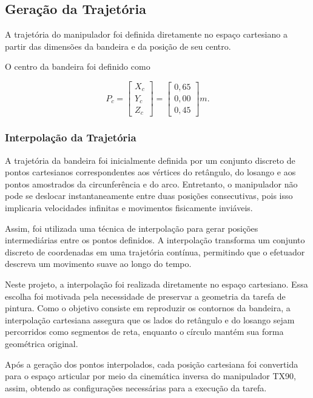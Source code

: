 \newpage
\subsection{Geração da Trajetória}

A trajetória do manipulador foi definida diretamente no espaço cartesiano a partir das dimensões da bandeira e da posição de seu centro.

O centro da bandeira foi definido como

\[
P_c=
\begin{bmatrix}
X_c\\
Y_c\\
Z_c
\end{bmatrix}
=
\begin{bmatrix}
0,65\\
0,00\\
0,45
\end{bmatrix}
m.
\]

\subsubsection{Interpolação da Trajetória}

A trajetória da bandeira foi inicialmente definida por um conjunto discreto de
pontos cartesianos correspondentes aos vértices do retângulo, do losango e aos
pontos amostrados da circunferência e do arco. Entretanto, o manipulador não pode
se deslocar instantaneamente entre duas posições consecutivas, pois isso
implicaria velocidades infinitas e movimentos fisicamente inviáveis.

Assim, foi utilizada uma técnica de interpolação para gerar posições
intermediárias entre os pontos definidos. A interpolação transforma um conjunto
discreto de coordenadas em uma trajetória contínua, permitindo que o efetuador
descreva um movimento suave ao longo do tempo.

Neste projeto, a interpolação foi realizada diretamente no espaço cartesiano.
Essa escolha foi motivada pela necessidade de preservar a geometria da tarefa de
pintura. Como o objetivo consiste em reproduzir os contornos da bandeira, a
interpolação cartesiana assegura que os lados do retângulo e do losango sejam
percorridos como segmentos de reta, enquanto o círculo mantém sua forma
geométrica original.

Após a geração dos pontos interpolados, cada posição cartesiana foi convertida
para o espaço articular por meio da cinemática inversa do manipulador TX90,
assim, obtendo as configurações necessárias para a execução da tarefa.

